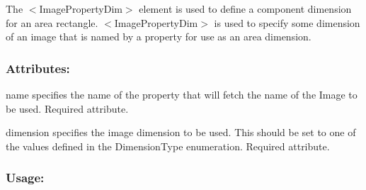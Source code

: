The {\ttfamily $<$Image\+Property\+Dim$>$} element is used to define a component dimension for an area rectangle. {\ttfamily $<$Image\+Property\+Dim$>$} is used to specify some dimension of an image that is named by a property for use as an area dimension.\hypertarget{fal_element_ref_fal_elem_ref_sec_imagepropertydim_2}{}\subsubsection{Attributes\+:}\label{fal_element_ref_fal_elem_ref_sec_imagepropertydim_2}
\begin{DoxyItemize}
\item {\ttfamily name} specifies the name of the property that will fetch the name of the Image to be used. Required attribute. \item {\ttfamily dimension} specifies the image dimension to be used. This should be set to one of the values defined in the Dimension\+Type enumeration. Required attribute.\end{DoxyItemize}
\hypertarget{fal_element_ref_fal_elem_ref_sec_imagepropertydim_3}{}\subsubsection{Usage\+:}\label{fal_element_ref_fal_elem_ref_sec_imagepropertydim_3}

